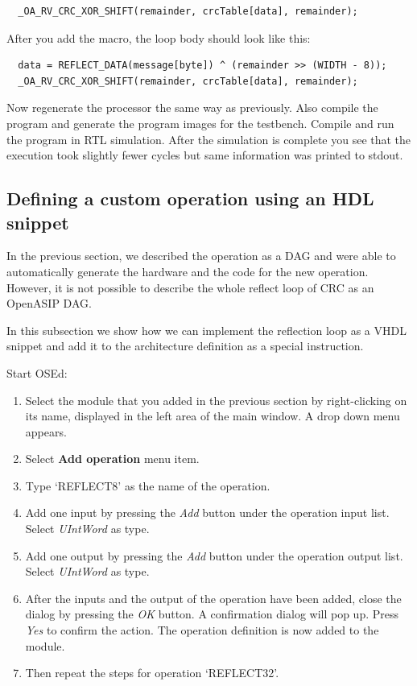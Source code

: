 \documentclass[a4paper,twoside]{tceusermanual}
\begin{document}
\begin{verbatim}
  _OA_RV_CRC_XOR_SHIFT(remainder, crcTable[data], remainder);
\end{verbatim}

After you add the macro, the loop body should look like this:
\begin{verbatim}
  data = REFLECT_DATA(message[byte]) ^ (remainder >> (WIDTH - 8));
  _OA_RV_CRC_XOR_SHIFT(remainder, crcTable[data], remainder);
\end{verbatim}

Now regenerate the processor the same way as previously. Also compile the
program and generate the program images for the testbench. Compile and run
the program in RTL simulation. After the simulation is complete you see that
the execution took slightly fewer cycles but same information was printed to stdout.

\subsection{Defining a custom operation using an HDL snippet}

In the previous section, we described the operation as a DAG and were able to
automatically generate the hardware and the code for the new operation. However, it is not
possible to describe the whole reflect loop of CRC as an OpenASIP DAG.

In this subsection we show how we can implement the reflection loop as a VHDL
snippet and add it to the architecture definition as a special instruction.

Start OSEd: 

\begin{enumerate}

\item%
  Select the module that you added in the previous section by right-clicking
  on its name, displayed in the left area of the main window.
  A drop down menu appears.
\item%
  Select \textbf{Add operation} menu item.
\item%
  Type `REFLECT8' as the name of the operation.
\item%
  Add one input by pressing the \emph{Add} button under the operation input
  list. Select \textit{UIntWord} as type.
\item%
  Add one output by pressing the \emph{Add} button under the operation output
  list. Select \textit{UIntWord} as type.
\item%
  After the inputs and the output of the operation have been added, close
  the dialog by pressing the \emph{OK} button. A confirmation dialog will pop
  up. Press \emph{Yes} to confirm the action. The operation definition is
  now added to the module.
\item%
  Then repeat the steps for operation `REFLECT32'.
\end{enumerate}
\end{document}
